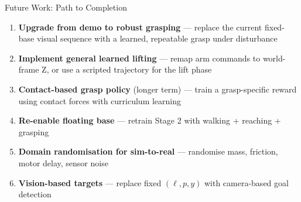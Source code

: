 \documentclass[10pt,aspectratio=169]{beamer}
\begin{document}
\begin{frame}{Future Work: Path to Completion}
  \begin{enumerate}
    \setlength{\itemsep}{6pt}
    \item \textbf{Upgrade from demo to robust grasping} ---
          replace the current fixed-base visual sequence with a learned,
          repeatable grasp under disturbance

    \item \textbf{Implement general learned lifting} ---
          remap arm commands to world-frame Z,
          or use a scripted trajectory for the lift phase

    \item \textbf{Contact-based grasp policy} (longer term) ---
          train a grasp-specific reward using contact forces
          with curriculum learning

    \item \textbf{Re-enable floating base} ---
          retrain Stage 2 with walking + reaching + grasping

    \item \textbf{Domain randomisation for sim-to-real} ---
          randomise mass, friction, motor delay, sensor noise

    \item \textbf{Vision-based targets} ---
          replace fixed $(\ell, p, y)$ with camera-based goal detection
  \end{enumerate}
\end{frame}
\end{document}
